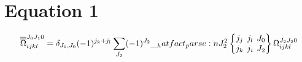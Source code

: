 \documentclass{scrartcl}
\newcommand{\sixj}[6]{\begingroup\setlength{\arraycolsep}{0.2em}\begin{Bmatrix} #1 & #2 & #3 \\ #4 & #5 & #6 \end{Bmatrix}\endgroup}
\begin{document}
\section{Equation 1}
\begin{dmath*}
\overline{\overline{\Omega}}_{i j k l}^{{J}_{0} {J}_{1} 0} = \delta_{{J}_{1},{J}_{0}} \* (-1)^{{j}_{k}+{j}_{l}} \* \sum_{{J}_{2}} \* (-1)^{{J}_{2}} \* \hatfact{{J}_{2}^{2}} \* \sixj{{j}_{j}}{{j}_{l}}{{J}_{0}}{{j}_{k}}{{j}_{i}}{{J}_{2}} \* \Omega_{i j k l}^{{J}_{2} {J}_{2} 0}
\end{dmath*}
\end{document}
